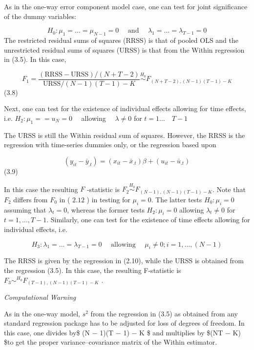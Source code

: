 \documentclass[
]{book}
\begin{document}
As in the one-way error component model case, one can test for joint significance of the dummy
variables:

\[
H_{0}: \mu_{1}=\ldots=\mu_{N-1}=0 \quad \text { and } \quad \lambda_{1}=\ldots=\lambda_{T-1}=0
\]
The restricted residual sums of squares (RRSS) is that of pooled OLS and the unrestricted residual sums of squares (URSS) is that from the Within regression in (3.5). In this case,

\begin{equation}
F_{1}=\frac{(\mathrm{RRSS}-\mathrm{URSS}) /(N+T-2)}{\mathrm{URSS} /(N-1)(T-1)-K} \stackrel{H_{0}}{\sim} F_{(N+T-2),(N-1)(T-1)-K}
\end{equation} (3.8)

Next, one can test for the existence of individual effects allowing for time effects, i.e.
\(H_{2}: \mu_{1}==u_{N}=0 \quad\) allowing \(\quad \lambda \neq 0\) for \(t=1 \ldots \quad T-1\)

The URSS is still the Within residual sum of squares. However, the RRSS is the regression with time-series dummies only, or the regression based upon

\begin{equation}
\left(y_{i t}-\bar{y}_{. t}\right)=\left(x_{i t}-\bar{x}_{. t}\right) \beta+\left(u_{i t}-\bar{u}_{. t}\right)
\end{equation} (3.9)

In this case the resulting \(F\) -statistic is \(F_{2} \stackrel{H_{0}}{\sim} F_{(N-1),(N-1)(T-1)-K}\). Note that \(F_{2}\) differs from \(F_{0}\) in ( \(2.12\) ) in testing for \(\mu_{i}=0\). The latter tests \(H_{0}: \mu_{i}=0\) assuming that \(\lambda_{t}=0\), whereas the former tests \(H_{2}: \mu_{i}=0\) allowing \(\lambda_{t} \neq 0\) for \(t=1, \ldots, T-1\). Similarly, one can test for the existence of time effects allowing for individual effects, i.e.

\begin{equation}
H_{3}: \lambda_{1}=\ldots=\lambda_{T-1}=0 \quad \text { allowing } \quad \mu_{i} \neq 0 ; i=1, \ldots,(N-1)
\end{equation}

The RRSS is given by the regression in (2.10), while the URSS is obtained from the regression
(3.5). In this case, the resulting F-statistic is \(F_{3} \sim^{H_{0}} F_{(T-1),(N-1)(T-1)-K}\) .

\emph{Computational Warning}

As in the one-way model, \(s^2\) from the regression in (3.5) as obtained from any standard regression package has to be adjusted for loss of degrees of freedom. In this case, one divides by\$ (N − 1)(T − 1) − K \$ and multiplies by \$(NT − K) \$to get the proper variance--covariance matrix of the Within estimator.
\end{document}
